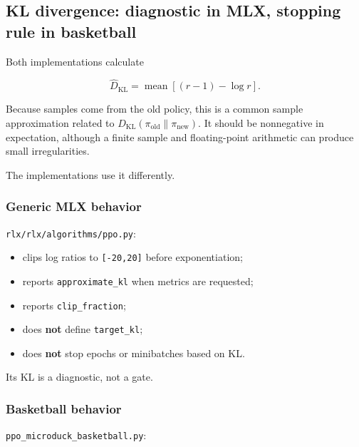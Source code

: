\documentclass[
  american,
  11pt,
  letterpaper,
]{article}
\providecommand{\tightlist}{%
  \setlength{\itemsep}{0pt}\setlength{\parskip}{0pt}}
\begin{document}
\subsection{KL divergence: diagnostic in MLX, stopping rule in
basketball}\label{kl-divergence-diagnostic-in-mlx-stopping-rule-in-basketball}

Both implementations calculate

\[
\widehat D_{\mathrm{KL}}
=
\operatorname{mean}\left[(r-1)-\log r\right].
\]

Because samples come from the old policy, this is a common sample
approximation related to
\(D_{\mathrm{KL}}(\pi_{\mathrm{old}}\|\pi_{\mathrm{new}})\). It should
be nonnegative in expectation, although a finite sample and
floating-point arithmetic can produce small irregularities.

The implementations use it differently.

\subsubsection{Generic MLX behavior}\label{generic-mlx-behavior}

\texttt{rlx/\allowbreak{}rlx/\allowbreak{}algorith\allowbreak{}ms/\allowbreak{}ppo.py}:

\begin{itemize}
\tightlist
\item
  clips log ratios to \texttt{{[}-20,20{]}} before exponentiation;
\item
  reports \texttt{approxim\allowbreak{}ate\_\allowbreak{}kl} when
  metrics are requested;
\item
  reports \texttt{clip\_\allowbreak{}fraction\allowbreak{}};
\item
  does \textbf{not} define \texttt{target\_kl};
\item
  does \textbf{not} stop epochs or minibatches based on KL.
\end{itemize}

Its KL is a diagnostic, not a gate.

\subsubsection{Basketball behavior}\label{basketball-behavior}

\texttt{ppo\_\allowbreak{}microduc\allowbreak{}k\_\allowbreak{}basketba\allowbreak{}ll.py}:
\end{document}
